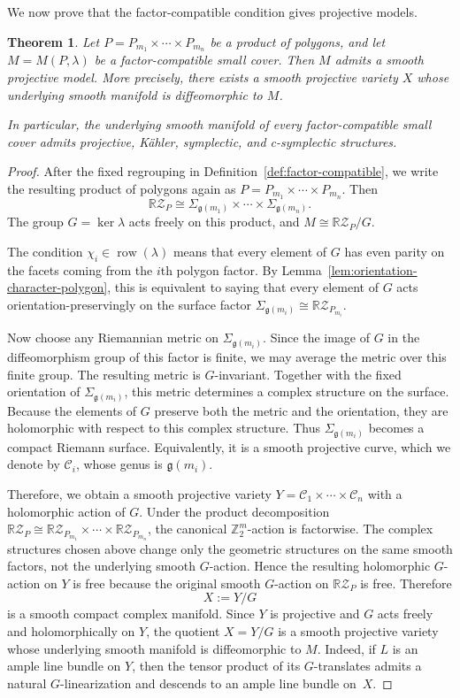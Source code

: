 \documentclass{amsart}
\newtheorem{theorem}{Theorem}[section]
\numberwithin{equation}{section}
\theoremstyle{definition}
\theoremstyle{remark}
\newcommand{\Z}{\mathbb Z}
\newcommand{\cC}{\mathcal C}
\newcommand{\RZ}{\mathbb R\mathcal Z}
\newcommand{\genus}{\mathfrak g}
\DeclareMathOperator{\row}{row}
\begin{document}
We now prove that the factor-compatible condition gives projective models.

\begin{theorem}\label{thm:factor-compatible-projective}
Let $P=P_{m_1}\times\cdots\times P_{m_n}$ be a product of polygons, and let $M=M(P,\lambda)$ be a factor-compatible small cover.
Then $M$ admits a smooth projective model.
More precisely, there exists a smooth projective variety $X$ whose underlying smooth manifold is diffeomorphic to $M$.

In particular, the underlying smooth manifold of every factor-compatible small cover admits projective, K\"ahler, symplectic, and c-symplectic structures.
\end{theorem}

\begin{proof}
After the fixed regrouping in Definition~\ref{def:factor-compatible}, we write the resulting product of polygons again as $P=P_{m_1}\times\cdots\times P_{m_n}$.
Then
$$
    \RZ_P\cong \Sigma_{\genus(m_1)}\times\cdots\times \Sigma_{\genus(m_n)}.
$$
The group $G=\ker\lambda$ acts freely on this product, and $M\cong \RZ_P/G$.
    
The condition $\chi_i\in \row(\lambda)$ means that every element of $G$ has even parity on the facets coming from the $i$th polygon factor.
By Lemma~\ref{lem:orientation-character-polygon}, this is equivalent to saying that every element of $G$ acts orientation-preservingly on the surface factor $\Sigma_{\genus(m_i)}\cong \RZ_{P_{m_i}}$.
    
Now choose any Riemannian metric on $\Sigma_{\genus(m_i)}$.
Since the image of $G$ in the diffeomorphism group of this factor is finite, we may average the metric over this finite group.
The resulting metric is $G$-invariant.
Together with the fixed orientation of $\Sigma_{\genus(m_i)}$, this metric determines a complex structure on the surface.
Because the elements of $G$ preserve both the metric and the orientation, they are holomorphic with respect to this complex structure.
Thus $\Sigma_{\genus(m_i)}$ becomes a compact Riemann surface.
Equivalently, it is a smooth projective curve, which we denote by $\cC_i$, whose genus is $\genus(m_i)$.

Therefore, we obtain a smooth projective variety $Y=\cC_1\times\cdots\times \cC_n$ with a holomorphic action of $G$.
Under the product decomposition $\RZ_P\cong \RZ_{P_{m_1}}\times\cdots\times \RZ_{P_{m_n}}$, the canonical $\Z_2^m$-action is factorwise. 
The complex structures chosen above change only the geometric structures on the same smooth factors, not the underlying smooth $G$-action. 
Hence the resulting holomorphic $G$-action on $Y$ is free because the original smooth $G$-action on $\RZ_P$ is free.
Therefore
$$
    X:=Y/G
$$
is a smooth compact complex manifold.
Since $Y$ is projective and $G$ acts freely and holomorphically on $Y$, the quotient $X = Y/G$ is a smooth projective variety whose underlying smooth manifold is diffeomorphic to $M$.
Indeed, if $L$ is an ample line bundle on $Y$, then the tensor product of its $G$-translates admits a natural $G$-linearization and descends to an ample line bundle on~$X$.
\end{proof}
\end{document}
